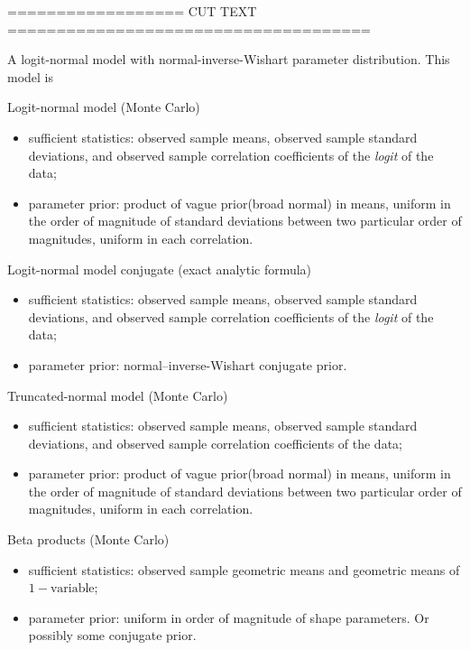 ================== CUT TEXT =====================================



  A logit-normal model with normal-inverse-Wishart parameter distribution.
  This model is 


  Logit-normal model (Monte Carlo) \citep[\cf][-- conforms the
  properties of the normal to bounded parameter
  spaces]{aitchisonetal1980,aitchison1982,aitchison1986}  \citep{johnson1949,mead1965}
  \begin{itemize}
  \item sufficient statistics: observed sample means, observed sample standard
    deviations, and observed sample correlation coefficients of the
    \emph{logit} of the data;
  \item parameter prior: product of vague prior(broad normal) in means,
    uniform in the order of magnitude of standard deviations between two
    particular order of magnitudes,
    uniform in each correlation.
  \end{itemize}


  Logit-normal model conjugate (exact analytic formula)
  \begin{itemize}
  \item sufficient statistics: observed sample means, observed sample standard
    deviations, and observed sample correlation coefficients of the
    \emph{logit} of the data;
  \item parameter prior: normal--inverse-Wishart conjugate prior.
    \citep[\chap~VIII]{zellneretal1964}
  \end{itemize}



  Truncated-normal model (Monte Carlo)
  \begin{itemize}
  \item sufficient statistics: observed sample means, observed sample
    standard deviations, and observed sample correlation coefficients of
    the data;
  \item parameter prior: product of vague prior(broad normal) in means,
    uniform in the order of magnitude of standard deviations between two
    particular order of magnitudes, uniform in each correlation.
  \end{itemize}
Beta products (Monte Carlo)
  \begin{itemize}
  \item sufficient statistics: observed sample geometric means and
    geometric means of $1-\text{variable}$;
  \item parameter prior: uniform in order of magnitude of shape
    parameters. Or possibly some conjugate prior.
  \end{itemize}


